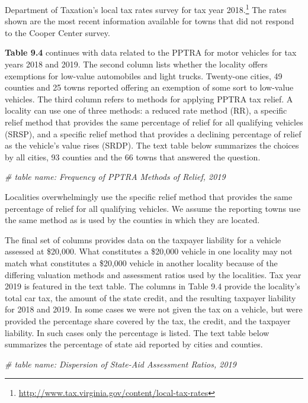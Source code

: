 \documentclass[
]{book}
\newenvironment{Shaded}{\begin{snugshade}}{\end{snugshade}}
\newcommand{\CommentTok}[1]{\textcolor[rgb]{0.56,0.35,0.01}{\textit{#1}}}
\begin{document}
Department of Taxation's local tax rates survey for tax year 2018.\footnote{\url{http://www.tax.virginia.gov/content/local-tax-rates}} The rates shown are the most recent information available for towns that did not respond to the Cooper Center survey.

\textbf{Table 9.4} continues with data related to the PPTRA for motor vehicles for tax years 2018 and 2019. The second column lists whether the locality offers exemptions for low-value automobiles and light trucks. Twenty-one cities, 49 counties and 25 towns reported offering an exemption of some sort to low-value vehicles. The third column refers to methods for applying PPTRA tax relief. A locality can use one of three methods: a reduced rate method (RR), a specific relief method that provides the same percentage of relief for all qualifying vehicles (SRSP), and a specific relief method that provides a declining percentage of relief as the vehicle's value rises (SRDP). The text table below summarizes the choices by all cities, 93 counties and the 66 towns that answered the question.

\begin{Shaded}
\begin{Highlighting}[]
\CommentTok{\# table name: Frequency of PPTRA Methods of Relief, 2019}
\end{Highlighting}
\end{Shaded}

Localities overwhelmingly use the specific relief method that provides the same percentage of relief for all qualifying vehicles. We assume the reporting towns use the same method as is used by the counties in which they are located.

The final set of columns provides data on the taxpayer liability for a vehicle assessed at \$20,000. What constitutes a \$20,000 vehicle in one locality may not match what constitutes a \$20,000 vehicle in another locality because of the differing valuation methods and assessment ratios used by the localities. Tax year 2019 is featured in the text table. The columns in Table 9.4 provide the locality's total car tax, the amount of the state credit, and the resulting taxpayer liability for 2018 and 2019. In some cases we were not given the tax on a vehicle, but were provided the percentage share covered by the tax, the credit, and the taxpayer liability. In such cases only the percentage is listed. The text table below summarizes the percentage of state aid reported by cities and counties.

\begin{Shaded}
\begin{Highlighting}[]
\CommentTok{\# table name: Dispersion of State{-}Aid Assessment Ratios, 2019}
\end{Highlighting}
\end{Shaded}
\end{document}
